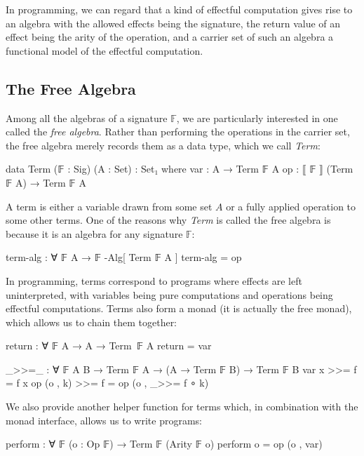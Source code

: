 In programming, we can regard that a kind of effectful computation gives rise to an algebra with the allowed effects being the signature, the return value of an effect being the arity of the operation, and a carrier set of such an algebra a functional model of the effectful computation.

\subsection{The Free Algebra}

Among all the algebras of a signature $\mathbb{F}$, we are particularly interested in one called the \emph{free algebra}.
%
Rather than performing the operations in the carrier set, the free algebra merely records them as a data type, which we call \textit{Term}:
%
\begin{center}\begin{code}
data Term (𝔽 : Sig) (A : Set) : Set₁ where
  var : A → Term 𝔽 A
  op : ⟦ 𝔽 ⟧ (Term 𝔽 A) → Term 𝔽 A
\end{code}\end{center}
%
A term is either a variable drawn from some set $A$ or a fully applied operation to some other terms.
%
One of the reasons why \textit{Term} is called the free algebra is because it is an algebra for any signature $\mathbb{F}$:
%
\begin{center}\begin{code}
term-alg : ∀ {𝔽} {A} → 𝔽 -Alg[ Term 𝔽 A ]
term-alg = op
\end{code}\end{center}
%

In programming, terms correspond to programs where effects are left uninterpreted, with variables being pure computations and operations being effectful computations.
%
Terms also form a monad (it is actually the free monad), which allows us to chain them together:
%
\begin{center}\begin{code}
return : ∀ {𝔽} {A} → A → Term 𝔽 A
return = var

_>>=_ : ∀ {𝔽} {A B} → Term 𝔽 A → (A → Term 𝔽 B) → Term 𝔽 B
var x      >>= f = f x
op (o , k) >>= f = op (o , _>>= f ∘ k)
\end{code}\end{center}
%
We also provide another helper function for terms which, in combination with the monad interface, allows us to write programs:
%
\begin{center}\begin{code}
perform : ∀ {𝔽} (o : Op 𝔽) → Term 𝔽 (Arity 𝔽 o)
perform o = op (o , var)
\end{code}\end{center}

